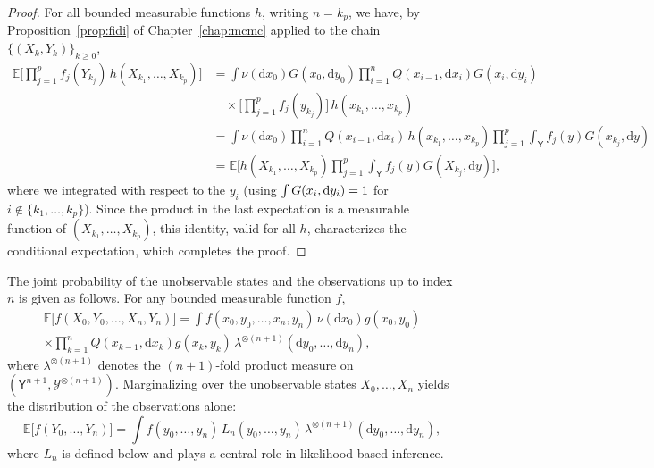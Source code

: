 \documentclass[english,graybox,envcountchap,envcountsame,sectrefs,shortlabels]{svmono}
\theoremstyle{style}
\newcommand{\eqsp}{}
\begin{document}
\begin{proof}
For all bounded measurable functions $h$, writing $n = k_p$, we have, by Proposition~\ref{prop:fidi} of Chapter~\ref{chap:mcmc} applied to the chain $\{(X_k,Y_k)\}_{k\geq0}$,
\begin{align*}
\mathbb{E}\Biggl[ \prod_{j=1}^{p} f_j(Y_{k_j}) \, h(X_{k_1}, \dots, X_{k_p}) \Biggr]
&= \int \nu(\mathrm{d}x_0) G(x_0,\mathrm{d}y_0)
\prod_{i=1}^{n} Q(x_{i-1}, \mathrm{d}x_i) G(x_i, \mathrm{d}y_i) \\
&\quad \times \Biggl[ \prod_{j=1}^{p} f_j(y_{k_j}) \Biggr] \, h(x_{k_1},\dots,x_{k_p}) \\
&= \int \nu(\mathrm{d}x_0) \prod_{i=1}^{n} Q(x_{i-1},\mathrm{d}x_i) \, h(x_{k_1},\dots,x_{k_p})
\prod_{j=1}^p \int_{\mathsf{Y}} f_j(y) G(x_{k_j}, \mathrm{d}y)\\
&= \mathbb{E}\Biggl[h(X_{k_1}, \dots, X_{k_p})\prod_{j=1}^p \int_{\mathsf{Y}} f_j(y) G(X_{k_j}, \mathrm{d}y)\Biggr]\eqsp,
\end{align*}
where we integrated with respect to the $y_i$ (using $\int G(x_i,\mathrm{d} y_i) = 1$ for $i\notin\{k_1,\ldots,k_p\}$). Since the product in the last expectation is a measurable function of $(X_{k_1},\ldots,X_{k_p})$, this identity, valid for all $h$, characterizes the conditional expectation, which completes the proof.
\end{proof}
The joint probability of the unobservable states and the observations up to
index $n$ is given as follows. For any bounded measurable function $f$,
\begin{multline}\label{eq:joint-probability-HMM}
\mathbb{E}\bigl[f(X_0, Y_0, \dots, X_n, Y_n)\bigr] =
\int f(x_0, y_0, \dots, x_n, y_n) \,
\nu(\mathrm{d}x_0) g(x_0, y_0)
\\ \times \prod_{k=1}^{n} Q(x_{k-1}, \mathrm{d}x_k) g(x_k, y_k) \, \lambda^{\otimes (n+1)}(\mathrm{d}y_0, \dots, \mathrm{d}y_n)\eqsp,
\end{multline}
where $\lambda^{\otimes (n+1)}$ denotes the $(n+1)$-fold product measure on $(\mathsf{Y}^{n+1},\mathcal{Y}^{\otimes (n+1)})$. Marginalizing over the unobservable states $X_0, \dots, X_n$ yields the
distribution of the observations alone:
\begin{equation}\label{eq:marginal-observations}
\mathbb{E}\bigl[f(Y_0, \dots, Y_n)\bigr] =
 \int f(y_0, \dots, y_n) \, L_{n}(y_0, \dots, y_n) \,
\lambda^{\otimes (n+1)}(\mathrm{d}y_0, \dots, \mathrm{d}y_n)\eqsp,
\end{equation}
where $L_{n}$ is defined below and plays a central role in likelihood-based inference.
\end{document}
